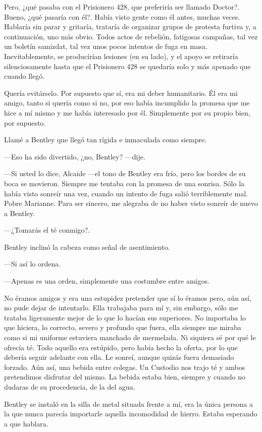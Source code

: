 Pero, ¿qué pasaba con el Prisionero 428, que preferiría ser llamado
Doctor?. Bueno, ¿qué pasaría con él?. Había visto gente como él antes,
muchas veces. Hablaría sin parar y gritaría, trataría de organizar
grupos de protesta furtiva y, a continuación, uno más obvio. Todos actos
de rebelión, fatigosas campañas, tal vez un boletín samizdat, tal vez
unos pocos intentos de fuga en masa. Inevitablemente, se producírían
lesiones (en su lado), y el apoyo se retiraría silenciosamente hasta que
el Prisionero 428 se quedaría solo y más apenado que cuando llegó.

Quería evitárselo. Por supuesto que sí, era mi deber humanitario. Él era
mi amigo, tanto si quería como si no, por eso había incumplido la
promesa que me hice a mí mismo y me había interesado por él. Simplemente
por su propio bien, por supuesto.

Llamé a Bentley que llegó tan rígida e inmaculada como siempre.

---Eso ha sido divertido, ¿no, Bentley? ---dije.

---Si usted lo dice, Alcaide ---el tono de Bentley era frío, pero los
bordes de su boca se movieron. Siempre me tentaba con la promesa de una
sonrisa. Sólo la había visto sonreír una vez, cuando un intento de fuga
salió terriblemente mal. Pobre Marianne. Para ser sincero, me alegraba
de no haber visto sonreír de nuevo a Bentley.

---¿Tomarás el té conmigo?.

Bentley inclinó la cabeza como señal de asentimiento.

---Si así lo ordena.

---Apenas es una orden, simplemente una costumbre entre amigos.

No éramos amigos y era una estupidez pretender que sí lo éramos pero,
aún así, no pude dejar de intentarlo. Ella trabajaba para mí y, sin
embargo, sólo me trataba ligeramente mejor de lo que lo hacían sus
superiores. No importaba lo que hiciera, lo correcto, severo y profundo
que fuera, ella siempre me miraba como si mi uniforme estuviera manchado
de mermelada. Ni siquiera sé por qué le ofrecía té. Todo aquello era
estúpido, pero había hecho la oferta, por lo que debería seguir adelante
con ella. Le sonreí, aunque quizás fuera demasiado forzado. Aún así, una
bebida entre colegas. Un Custodio nos trajo té y ambos pretendimos
disfrutar del mismo. La bebida estaba bien, siempre y cuando no dudaras
de su procedencia, de la del agua.

Bentley se instaló en la silla de metal situada frente a mí, era la
única persona a la que nunca parecía importarle aquella incomodidad de
hierro. Estaba esperando a que hablara.

